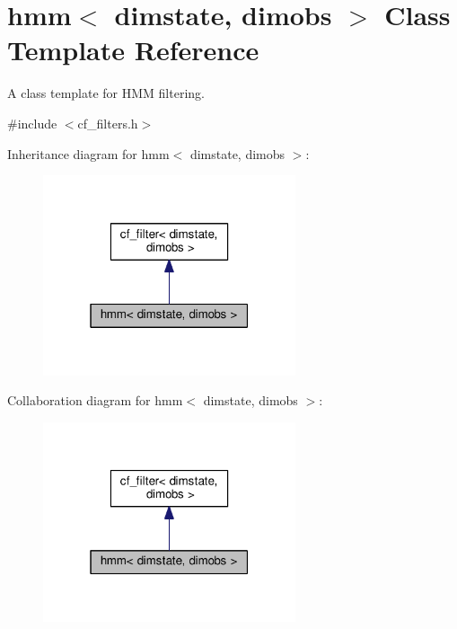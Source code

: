 \hypertarget{classhmm}{}\section{hmm$<$ dimstate, dimobs $>$ Class Template Reference}
\label{classhmm}


A class template for H\+MM filtering.  




{\ttfamily \#include $<$cf\+\_\+filters.\+h$>$}



Inheritance diagram for hmm$<$ dimstate, dimobs $>$\+:\nopagebreak
\begin{figure}[H]
\begin{center}
\leavevmode
\includegraphics[width=211pt]{classhmm__inherit__graph}
\end{center}
\end{figure}


Collaboration diagram for hmm$<$ dimstate, dimobs $>$\+:\nopagebreak
\begin{figure}[H]
\begin{center}
\leavevmode
\includegraphics[width=211pt]{classhmm__coll__graph}
\end{center}
\end{figure}
